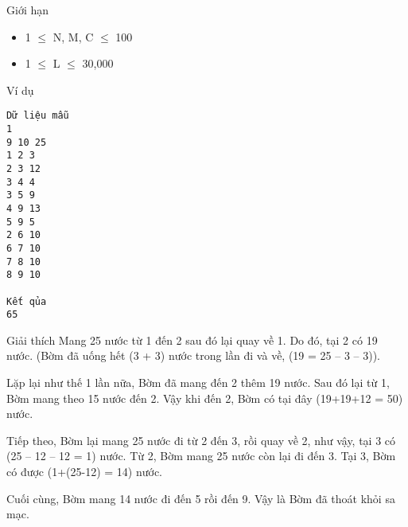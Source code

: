 Giới hạn
\begin{itemize}
	\item 1  $\le$  N, M, C  $\le$  100
	\item 1  $\le$  L  $\le$  30,000
\end{itemize}
Ví dụ
\begin{verbatim}
Dữ liệu mẫu
1
9 10 25 
1 2 3 
2 3 12 
3 4 4 
3 5 9 
4 9 13 
5 9 5 
2 6 10 
6 7 10 
7 8 10 
8 9 10 

Kết qủa
65 
\end{verbatim}
Giải thích
Mang 25 nước từ 1 đến 2 sau đó lại quay về 1. Do đó, tại 2 có 19 nước. (Bờm đã uống hết (3 + 3) nước trong lần đi và về, (19 = 25 – 3 – 3)).

Lặp lại như thế 1 lần nữa, Bờm đã mang đến 2 thêm 19 nước. Sau đó lại từ 1, Bờm mang theo 15 nước đến 2. Vậy khi đến 2, Bờm có tại đây (19+19+12 = 50) nước.

Tiếp theo, Bờm lại mang 25 nước đi từ 2 đến 3, rồi quay về 2, như vậy, tại 3 có (25 – 12 – 12 = 1) nước. Từ 2, Bờm mang 25 nước còn lại đi đến 3. Tại 3, Bờm có được (1+(25-12) = 14) nước.

Cuối cùng, Bờm mang 14 nước đi đến 5 rồi đến 9. Vậy là Bờm đã thoát khỏi sa mạc.